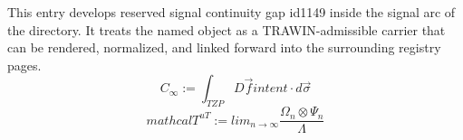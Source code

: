 
\begin{tzpsnapshot}
\end{tzpsnapshot}

This entry develops reserved signal continuity gap id1149 inside the signal arc of the directory. It treats the named object as a TRAWIN-admissible carrier that can be rendered, normalized, and linked forward into the surrounding registry pages.
\[
C_{\infty} := \int_{TZP} D \vec{f} {intent} \cdot d\vec{\sigma}
\]
\[
mathcal{T}^{uT}:=lim_{n\rightarrow\infty}\frac{\Omega_{n}\otimes\Psi_{n}}{\Lambda}
\]

